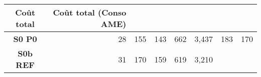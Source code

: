 \begin{longtable}[]{@{}crrrrrrr@{}}
\begin{minipage}[b]{0.08\columnwidth}
Coût total\strut
\end{minipage} & \begin{minipage}[b]{0.14\columnwidth}\raggedleft\strut
Coût total (Conso AME)\strut
\end{minipage}\tabularnewline
\midrule
\endhead
\begin{minipage}[t]{0.10\columnwidth}\centering\strut
\textbf{S0 P0}\strut
\end{minipage} & \begin{minipage}[t]{0.11\columnwidth}\raggedleft\strut
28\strut
\end{minipage} & \begin{minipage}[t]{0.06\columnwidth}\raggedleft\strut
155\strut
\end{minipage} & \begin{minipage}[t]{0.13\columnwidth}\raggedleft\strut
143\strut
\end{minipage} & \begin{minipage}[t]{0.07\columnwidth}\raggedleft\strut
662\strut
\end{minipage} & \begin{minipage}[t]{0.09\columnwidth}\raggedleft\strut
3,437\strut
\end{minipage} & \begin{minipage}[t]{0.08\columnwidth}\raggedleft\strut
183\strut
\end{minipage} & \begin{minipage}[t]{0.14\columnwidth}\raggedleft\strut
170\strut
\end{minipage}\tabularnewline
\begin{minipage}[t]{0.10\columnwidth}\centering\strut
\textbf{S0b REF}\strut
\end{minipage} & \begin{minipage}[t]{0.11\columnwidth}\raggedleft\strut
31\strut
\end{minipage} & \begin{minipage}[t]{0.06\columnwidth}\raggedleft\strut
170\strut
\end{minipage} & \begin{minipage}[t]{0.13\columnwidth}\raggedleft\strut
159\strut
\end{minipage} & \begin{minipage}[t]{0.07\columnwidth}\raggedleft\strut
619\strut
\end{minipage} & \begin{minipage}[t]{0.09\columnwidth}\raggedleft\strut
3,210\strut
\end{minipage} & \begin{minipage}[t]{0.08\columnwidth}\raggedleft\strut

\end{minipage}
\end{longtable}
